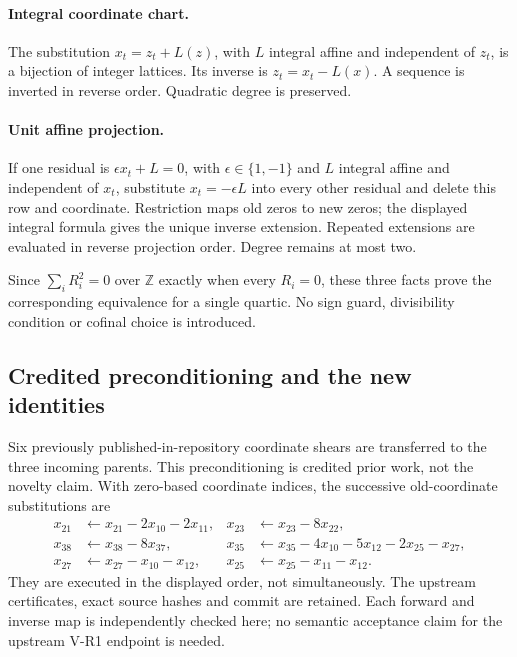 \paragraph{Integral coordinate chart.}
The substitution $x_t=z_t+L(z)$, with $L$ integral affine and independent
of $z_t$, is a bijection of integer lattices.  Its inverse is
$z_t=x_t-L(x)$.  A sequence is inverted in reverse order.  Quadratic
degree is preserved.

\paragraph{Unit affine projection.}
If one residual is $\epsilon x_t+L=0$, with $\epsilon\in\{1,-1\}$
and $L$ integral affine and independent of $x_t$, substitute
$x_t=-\epsilon L$ into every other residual and delete this row and
coordinate.  Restriction maps old zeros to new zeros; the displayed
integral formula gives the unique inverse extension.  Repeated extensions
are evaluated in reverse projection order.  Degree remains at most two.

Since $\sum_i R_i^2=0$ over $\mathbb Z$ exactly when every $R_i=0$,
these three facts prove the corresponding equivalence for a single quartic.
No sign guard, divisibility condition or cofinal choice is introduced.

\subsection{Credited preconditioning and the new identities}

Six previously published-in-repository coordinate shears are transferred
to the three incoming parents.  This preconditioning is credited prior
work, not the novelty claim.  With zero-based coordinate indices, the
successive old-coordinate substitutions are
\[
\begin{aligned}
x_{21}&\leftarrow x_{21}-2x_{10}-2x_{11},&
x_{23}&\leftarrow x_{23}-8x_{22},\\
x_{38}&\leftarrow x_{38}-8x_{37},&
x_{35}&\leftarrow x_{35}-4x_{10}-5x_{12}-2x_{25}-x_{27},\\
x_{27}&\leftarrow x_{27}-x_{10}-x_{12},&
x_{25}&\leftarrow x_{25}-x_{11}-x_{12}.
\end{aligned}
\]
They are executed in the displayed order, not simultaneously.  The
upstream certificates, exact source hashes and commit are retained.
Each forward and inverse map is independently checked here; no semantic
acceptance claim for the upstream V-R1 endpoint is needed.

